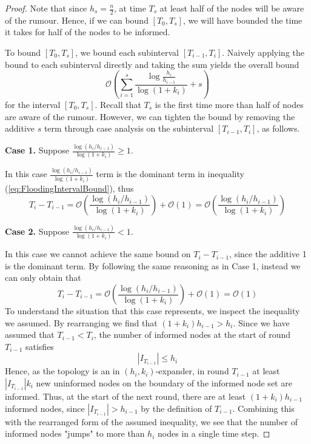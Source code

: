 \begin{proof}
	Note that since $h_s = \frac{n}{2}$, at time $T_s$ at least half of the nodes will be aware of the rumour. Hence, if we can bound $[T_0, T_s]$, we will have bounded the time it takes for half of the nodes to be informed. 

	To bound $[T_0, T_s]$, we bound each subinterval $[T_{i-1}, T_i]$. Naively applying the bound to each subinterval directly and taking the sum yields the overall bound 
	$$
		\mathcal{O}\left(\sum_{i=1}^s \frac{\log \frac{h_i}{h_{i-1}}}{\log(1+k_i)} + s\right)
	$$ 
	for the interval $[T_0,T_s]$. Recall that $T_s$ is the first time more than half of nodes are aware of the rumour. However, we can tighten the bound by removing the additive $s$ term through case analysis on the subinterval $[T_{i-1}, T_i]$, as follows.

	\textbf{Case 1.} Suppose $\frac{\log (h_i/h_{i-1})}{\log(1+k_i)} \geq 1$.

	In this case $\frac{\log (h_i/h_{i-1})}{\log(1+k_i)}$ term is the dominant term in inequality (\ref{eq:FloodingIntervalBound}), thus
	$$
		T_i - T_{i-1} = \mathcal{O}\left( \frac{\log (h_i/h_{i-1})}{\log(1+k_i) }\right) + \mathcal{O}(1) = \mathcal{O}\left( \frac{\log (h_i/h_{i-1})}{\log(1+k_i) }\right)
	$$

	\textbf{Case 2.} Suppose $\frac{\log (h_i/h_{i-1})}{\log(1+k_i)} < 1$.

	In this case we cannot achieve the same bound on $T_i - T_{i-1}$, since the additive 1 is the dominant term. By following the same reasoning as in Case 1, instead we can only obtain that
	\begin{equation}\label{eq:Weak1StepBound}
		T_i - T_{i-1} = \mathcal{O}\left( \frac{\log (h_i/h_{i-1})}{\log(1+k_i) }\right) + \mathcal{O}(1) = \mathcal{O}(1)
	\end{equation}
	To understand the situation that this case represents, we inspect the inequality we assumed.
	By rearranging we find that $(1+k_i)h_{i-1} > h_i$. Since we have assumed that $T_{i-1} < T_i$, %
	the number of informed nodes at the start of round $T_{i-1}$ satisfies
	$$
		|I_{T_{i-1}}| \leq h_i
	$$
	Hence, as the topology is an in $(h_i, k_i)$-expander, in round $T_{i-1}$ at least $|I_{T_{i-1}}|k_i$ new uninformed nodes on the boundary of the informed node set are informed. Thus, at the start of the next round, there are at least $(1+k_i)h_{i-1}$ informed nodes, since $|I_{T_{i-1}}| > h_{i-1}$ by the definition of $T_{i-1}$. Combining this with the rearranged form of the assumed inequality, we see that the number of informed nodes "jumps" to more than $h_i$ nodes in a single time step.


\end{proof}
